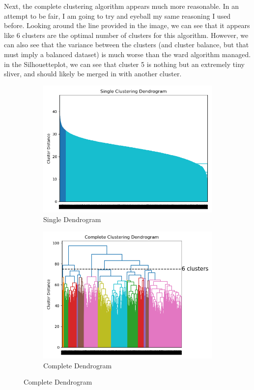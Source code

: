 \documentclass[12pt]{article}
\begin{document}
Next, the complete clustering algorithm appears much more reasonable. In an attempt to be fair, I am going to try and 
eyeball my same reasoning I used before. Looking around the line provided in the image, we can see that it appears like 
6 clusters are the optimal number of clusters for this algorithm. However, we can also see that the variance between
the clusters (and cluster balance, but that must imply a balanced dataset) is much worse than the ward algorithm managed.
in the Silhouetteplot, we can see that cluster 5 is nothing but an extremely tiny sliver, and should likely be merged
in with another cluster.
\begin{figure}
    \begin{subfigure}{.5\textwidth}
        \includegraphics[width=.95\textwidth]{../results/agglo/Singledendrogram.png}
        \caption{Single Dendrogram}
        \end{subfigure}%
      \begin{subfigure}{.5\textwidth}
        \includegraphics[width=.95\textwidth]{../results/agglo/Completedendrogram.png}
        \caption{Complete Dendrogram}
      \end{subfigure}
      \label{figure6}
\end{figure}
\end{document}
